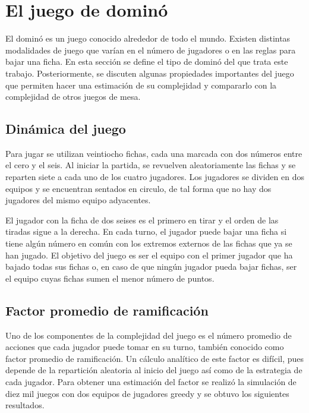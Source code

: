 \chapter{El juego de dominó}

\noindent

El dominó es un juego conocido alrededor de todo el mundo. Existen distintas
modalidades de juego que varían en el número de jugadores o en las reglas para
bajar una ficha. En esta sección se define el tipo de dominó del que trata este
trabajo. Posteriormente, se discuten algunas propiedades importantes del juego
que permiten hacer una estimación de su complejidad y compararlo con la
complejidad de otros juegos de mesa.

\newpage

\section{Dinámica del juego}

Para jugar se utilizan veintiocho fichas, cada una marcada con dos números entre
el cero y el seis. Al iniciar la partida, se revuelven aleatoriamente las fichas
y se reparten siete a cada uno de los cuatro jugadores. Los jugadores se dividen
en dos equipos y se encuentran sentados en circulo, de tal forma que no hay dos
jugadores del mismo equipo adyacentes.

El jugador con la ficha de dos seises es el primero en tirar y el orden de las
tiradas sigue a la derecha. En cada turno, el jugador puede bajar una ficha si
tiene algún número en común con los extremos externos de las fichas que ya se
han jugado. El objetivo del juego es ser el equipo con el primer jugador que ha
bajado todas sus fichas o, en caso de que ningún jugador pueda bajar fichas, ser
el equipo cuyas fichas sumen el menor número de puntos.

\section{Factor promedio de ramificación}

Uno de los componentes de la complejidad del juego es el número promedio de
acciones que cada jugador puede tomar en su turno, también conocido como factor
promedio de ramificación. Un cálculo analítico de este factor es difícil, pues
depende de la repartición aleatoria al inicio del juego así como de la
estrategia de cada jugador. Para obtener una estimación del factor se realizó la
simulación de diez mil juegos con dos equipos de jugadores greedy y se obtuvo
los siguientes resultados.

